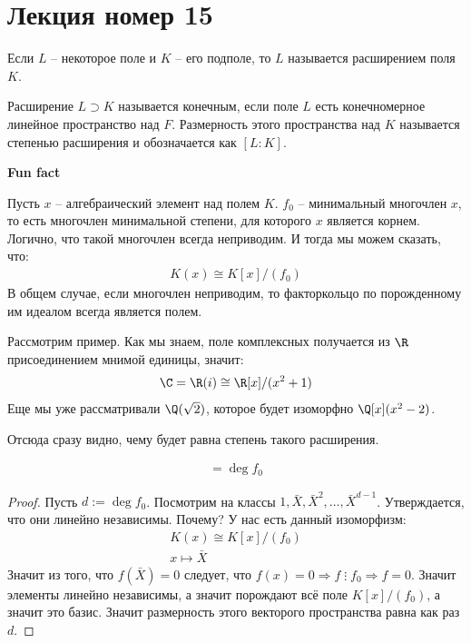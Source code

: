 \section{Лекция номер 15}

\begin{conj}
    Если $L$ -- некоторое поле и $K$ -- его подполе, то $L$ называется расширением поля $K$.
\end{conj}

\begin{conj}
Расширение $L \supset K$ называется конечным, если поле $L$ есть конечномерное линейное пространство над $F$. 
Размерность этого пространства над $K$ называется степенью расширения и обозначается как $[L : K]$. 
\end{conj}

\textbf{Fun fact}

Пусть $x$ -- алгебраический элемент над полем $K$. $f_0$ -- минимальный многочлен $x$, 
то есть многочлен минимальной степени, 
для которого $x$ является корнем. Логично, что такой многочлен всегда неприводим. И тогда мы можем сказать, что:
\begin{gather*}
    K(x) \cong K[x] / (f_0) 
\end{gather*}
В общем случае, если многочлен неприводим, то факторкольцо по порожденному им идеалом всегда является полем. 

Рассмотрим пример. Как мы знаем, поле комплексных получается из $\R$ присоединением мнимой единицы, значит: 
\begin{gather*}
    \C = \R(i) \cong \R[x] / (x^2 + 1)
\end{gather*}
Еще мы уже рассматривали $\Q(\sqrt{2})$, которое будет изоморфно $\Q[x](x^2 - 2)$. 

Отсюда сразу видно, чему будет равна степень такого расширения.

\follow 
\begin{gather*}
    [K(x) : K] = \deg{f_0}
\end{gather*}
\begin{proof}
    Пусть $d := \deg{f_0}$. Посмотрим на классы $1, \bar{X}, \bar{X}^2, \dots, \bar{X}^{d-1}$. 
    Утверждается, что они линейно независимы. Почему? У нас есть данный изоморфизм:
    \begin{gather*}
        K(x) \cong K[x] / (f_0) \\
        x \longmapsto \bar{X}
    \end{gather*}
    Значит из того, что $f(\bar{X}) = 0$ следует, что $f(x) = 0 \Longrightarrow f \; \vdots \; f_0 \Longrightarrow f = 0$. 
    Значит элементы линейно независимы, а значит порождают всё поле $K[x]/(f_0)$, а значит это базис. Значит размерность этого векторого пространства 
    равна как раз $d$. 
\end{proof}

